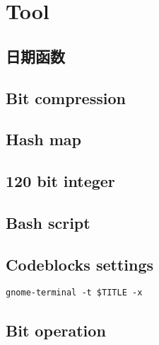 \section{Tool}
\subsection{日期函数}

\subsection{Bit compression}

\subsection{Hash map}

\subsection{120 bit integer}

\subsection{Bash script}

\subsection{Codeblocks settings}
	\begin{lstlisting}
gnome-terminal -t $TITLE -x
	\end{lstlisting}
\subsection{Bit operation}
